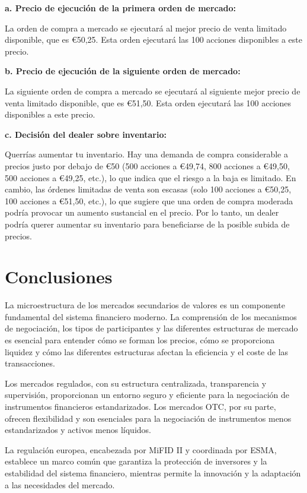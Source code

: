 \begin{solucion}[Ejercicio 3]
\textbf{a. Precio de ejecución de la primera orden de mercado:}

La orden de compra a mercado se ejecutará al mejor precio de venta limitado disponible, que es €50,25. Esta orden ejecutará las 100 acciones disponibles a este precio.

\textbf{b. Precio de ejecución de la siguiente orden de mercado:}

La siguiente orden de compra a mercado se ejecutará al siguiente mejor precio de venta limitado disponible, que es €51,50. Esta orden ejecutará las 100 acciones disponibles a este precio.

\textbf{c. Decisión del dealer sobre inventario:}

Querrías aumentar tu inventario. Hay una demanda de compra considerable a precios justo por debajo de €50 (500 acciones a €49,74, 800 acciones a €49,50, 500 acciones a €49,25, etc.), lo que indica que el riesgo a la baja es limitado. En cambio, las órdenes limitadas de venta son escasas (solo 100 acciones a €50,25, 100 acciones a €51,50, etc.), lo que sugiere que una orden de compra moderada podría provocar un aumento sustancial en el precio. Por lo tanto, un dealer podría querer aumentar su inventario para beneficiarse de la posible subida de precios.
\end{solucion}

\section{Conclusiones}

La microestructura de los mercados secundarios de valores es un componente fundamental del sistema financiero moderno. La comprensión de los mecanismos de negociación, los tipos de participantes y las diferentes estructuras de mercado es esencial para entender cómo se forman los precios, cómo se proporciona liquidez y cómo las diferentes estructuras afectan la eficiencia y el coste de las transacciones.

Los mercados regulados, con su estructura centralizada, transparencia y supervisión, proporcionan un entorno seguro y eficiente para la negociación de instrumentos financieros estandarizados. Los mercados OTC, por su parte, ofrecen flexibilidad y son esenciales para la negociación de instrumentos menos estandarizados y activos menos líquidos.

La regulación europea, encabezada por MiFID II y coordinada por ESMA, establece un marco común que garantiza la protección de inversores y la estabilidad del sistema financiero, mientras permite la innovación y la adaptación a las necesidades del mercado.

